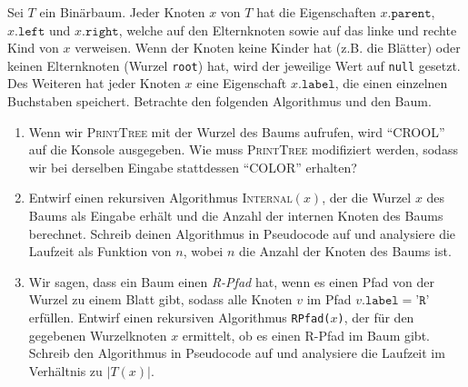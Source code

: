 \documentclass{uebung_cs}
\begin{document}
\begin{aufgabe}
	Sei $T$ ein Binärbaum.
	Jeder Knoten $x$ von $T$ hat die Eigenschaften $x.\texttt{parent}$, $x.\texttt{left}$ und $x.\texttt{right}$, welche auf den Elternknoten sowie auf das linke und rechte Kind von $x$ verweisen.
	Wenn der Knoten keine Kinder hat (z.B. die Blätter) oder keinen Elternknoten (Wurzel \texttt{root}) hat, wird der jeweilige Wert auf \texttt{null} gesetzt.
	Des Weiteren hat jeder Knoten $x$ eine Eigenschaft $x.\texttt{label}$, die einen einzelnen Buchstaben speichert.
	Betrachte den folgenden Algorithmus und den Baum.
	\begin{algorithmic}
			\EndIf
			\EndIf
		\EndIf
		\EndProcedure
	\end{algorithmic}
	\begin{center}
	\end{center}
	\begin{enumerate}
		\item \bestehen Wenn wir \textsc{PrintTree} mit der Wurzel des Baums aufrufen, wird \enquote{CROOL} auf die Konsole ausgegeben.
		Wie muss \textsc{PrintTree} modifiziert werden, sodass wir bei derselben Eingabe stattdessen \enquote{COLOR} erhalten?
		\item \mittel Entwirf einen rekursiven Algorithmus \textsc{Internal}$(x)$, der die Wurzel $x$ des Baums als Eingabe erhält und die Anzahl der internen Knoten des Baums berechnet.
		Schreib deinen Algorithmus in Pseudocode auf und analysiere die Laufzeit als Funktion von $n$, wobei $n$ die Anzahl der Knoten des Baums ist.
		\item \mittel Wir sagen, dass ein Baum einen \textit{R-Pfad} hat, wenn es einen Pfad von der Wurzel zu einem Blatt gibt, sodass alle Knoten $v$ im Pfad $v.\texttt{label} = \texttt{'R'}$ erfüllen.
		Entwirf einen rekursiven Algorithmus \texttt{RPfad($x$)}, der für den gegebenen Wurzelknoten $x$ ermittelt, ob es einen R-Pfad im Baum gibt.
		Schreib den Algorithmus in Pseudocode auf und analysiere die Laufzeit im Verhältnis zu $|T(x)|$.
	\end{enumerate}
\end{aufgabe}
\end{document}
